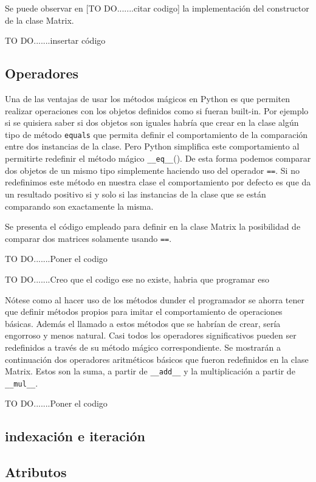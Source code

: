 \documentclass[10pt]{article}
\newcommand{\mgc}[1]{\texttt{\_\_#1\_\_}}
\newcommand{\csl}[1]{\texttt{#1}}
\newcommand{\todo}[1]{\color{red}TO DO.......#1\color{black}}
\begin{document}
Se puede observar en [\todo{citar codigo}] la implementaci\'on del constructor de la clase Matrix.

\todo{insertar c\'odigo}

\subsection{Operadores}

Una de las ventajas de usar los m\'etodos  m\'agicos en Python es que permiten realizar operaciones con los objetos definidos como si fueran built-in. Por ejemplo si se quisiera saber si dos objetos son iguales habr\'ia que crear en la clase alg\'un tipo de m\'etodo \csl{equals} que permita definir el comportamiento de la comparaci\'on entre dos instancias de la clase. Pero Python simplifica este comportamiento al permitirte redefinir el m\'etodo m\'agico \mgc{eq}(). De esta forma podemos comparar dos objetos de un mismo tipo simplemente haciendo uso del operador \csl{==}. Si no redefinimos este m\'etodo en nuestra clase el comportamiento por defecto es que da un resultado positivo si y solo si las instancias de la clase que se est\'an comparando son exactamente la misma.

Se presenta el c\'odigo empleado para definir en la clase Matrix la posibilidad de comparar dos matrices solamente usando \csl{==}.

\todo{Poner el codigo}

\todo{Creo que el codigo ese no existe, habria que programar eso}


N\'otese como al hacer uso de los m\'etodos dunder el programador se ahorra tener que definir m\'etodos propios para imitar el comportamiento de operaciones b\'asicas. Adem\'as el llamado a estos m\'etodos que se habr\'ian de crear, ser\'ia engorroso y menos natural. Casi todos los operadores significativos pueden ser redefinidos a trav\'es de su m\'etodo m\'agico correspondiente. Se mostrar\'an a continuaci\'on dos operadores aritm\'eticos b\'asicos que fueron redefinidos en la clase Matrix. Estos son la suma, a partir de \mgc{add} y la multiplicaci\'on a partir de \mgc{mul}.



\todo{Poner el codigo}

\subsection{indexaci\'on e iteraci\'on}

\subsection{Atributos}
\end{document}
